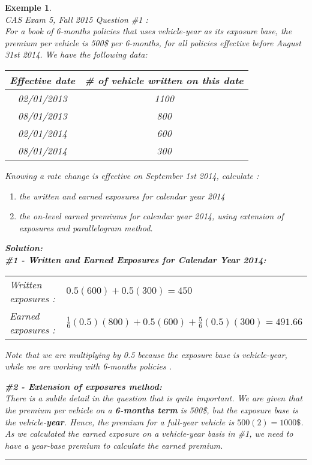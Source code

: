 \documentclass[11pt, english]{memoir}
\numberwithin{definition}{section}
\newtheorem{example}{Exemple}[section]
\newenvironment{exemple}
{
	\begin{example} \normalfont \ \\ 
	}
	{
		\hfill\rule{0.5em}{0.5em}\end{example}
}
\newenvironment{solution}
{\noindent\textbf{Solution:} \\ 
}{
}
\begin{document}
	\begin{exemple}
		CAS Exam 5, Fall 2015 Question \#1 : \\
		For a book of 6-months policies that uses vehicle-year as its exposure base, the premium per vehicle is 500\$ per 6-months, for all policies effective before August 31st 2014. We have the following data: 
		
		\begin{tabular}{cc}
			\toprule
			Effective date & \# of vehicle written on this date\\
			\midrule
			02/01/2013 & 1100\\
			08/01/2013 & 800 \\
			02/01/2014 & 600 \\
			08/01/2014 & 300
		\end{tabular}
	
	Knowing a rate change is effective on September 1st 2014, calculate : 
	\begin{enumerate}
		\item the written and earned exposures for calendar year 2014
		\item the on-level earned premiums for calendar year 2014, using extension of exposures and parallelogram method. 
	\end{enumerate}

	\begin{solution}
		\textbf{\#1 -  Written and Earned Exposures for Calendar Year 2014:}
		
		\begin{tabular}{ll}
			Written exposures : & $ 0.5(600) + 0.5(300) = 450 $\\
			Earned exposures : & $ \frac{1}{6}(0.5)(800) + 0.5(600) + \frac{5}{6}(0.5)(300) = 491.66 $
		\end{tabular}
	
		\small *Note that we are multiplying by 0.5 because the exposure base is vehicle-year, while we are working with 6-months policies .\normalsize
		
		\textbf{\#2 - Extension of exposures method: }\\[0pt]
			There is a subtle detail in the question that is quite important. We are given that the premium per vehicle on a \textbf{6-months term} is 500\$, but the exposure base is the vehicle-\textbf{year}. Hence, the premium for a full-year vehicle is $ 500(2) = 1000\$ $. As we calculated the earned exposure on a vehicle-year basis in \#1, we need to have a year-base premium to calculate the earned premium. 
			

\end{solution}
\end{exemple}
\end{document}
